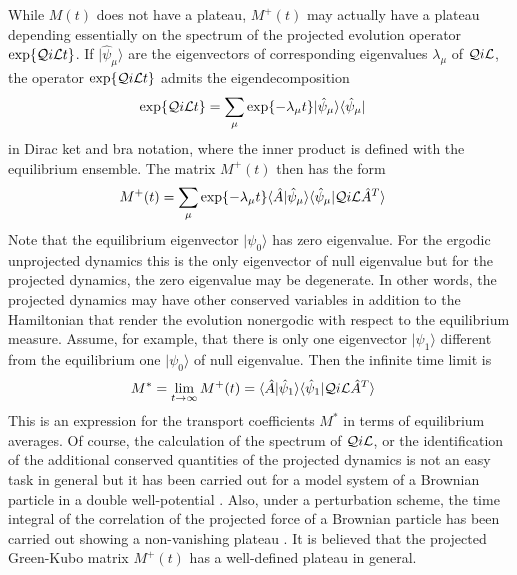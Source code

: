 \documentclass[b5paper,openright,10pt]{book}
\begin{document}
While $M(t)$  does not have  a plateau,  $M^+(t)$ may actually  have a
plateau  depending  essentially  on  the  spectrum  of  the  projected
evolution     operator    $\exp\{{\cal     Q}i{\cal    L}t\}$.      If
$|\hat{\psi}_\mu\rangle$  are  the   eigenvectors  of  corresponding
eigenvalues  $\lambda_\mu$  of  ${\cal   Q}i{\cal  L}$,  the  operator
$\exp\{{\cal Q}i{\cal L}t\}$ admits the eigendecomposition
\begin{align}
  \exp\{{\cal Q}i{\cal L}t\}&=\sum_\mu \exp\{-\lambda_\mu t\}|\hat{\psi}_\mu\rangle\langle\hat{\psi}_\mu|
\end{align}
in Dirac ket and bra notation, where the inner product is defined with
the equilibrium ensemble.  The matrix $M^+(t)$ then has the form
\begin{align}
  M^+(t)&=
\sum_\mu \exp\{-\lambda_\mu t\} \langle \hat{A}|\hat{\psi}_\mu\rangle
\langle\hat{\psi}_\mu|{\cal Q}i{\cal L}\hat{A}^{T} \rangle
\end{align}
Note  that  the  equilibrium  eigenvector  $|\psi_0\rangle$  has  zero
eigenvalue.  For  the ergodic  unprojected dynamics  this is  the only
eigenvector of  null eigenvalue  but for  the projected  dynamics, the
zero  eigenvalue may  be  degenerate. In  other  words, the  projected
dynamics  may  have  other  conserved variables  in  addition  to  the
Hamiltonian that render the evolution  nonergodic with respect to the
equilibrium  measure.  Assume,  for  example, that  there  is only  one
eigenvector  $|\psi_1\rangle$  different   from  the  equilibrium  one
$|\psi_0\rangle$ of null eigenvalue. Then the infinite time limit is
\begin{align}
M^*&=\lim_{t\to\infty}  M^+(t)=\langle \hat{A}|\hat{\psi}_1\rangle
\langle\hat{\psi}_1|{\cal Q}i{\cal L}\hat{A}^{T} \rangle
\end{align}
This is an expression for the transport coefficients $M^*$ in terms of
equilibrium averages.  Of  course, the calculation of  the spectrum of
${\cal Q}i{\cal L}$, or the identification of the additional conserved
quantities of  the projected dynamics is  not an easy task  in general
but it has been carried out for  a model system of a Brownian particle
in a  double well-potential \cite{Wu1989}. Also,  under a perturbation
scheme, the time integral of the correlation of the projected force of
a  Brownian particle  has  been carried  out  showing a  non-vanishing
plateau  \cite{Mazur1970}.    It  is   believed  that   the  projected
Green-Kubo matrix $M^+(t)$ has a well-defined plateau in general.
\end{document}
